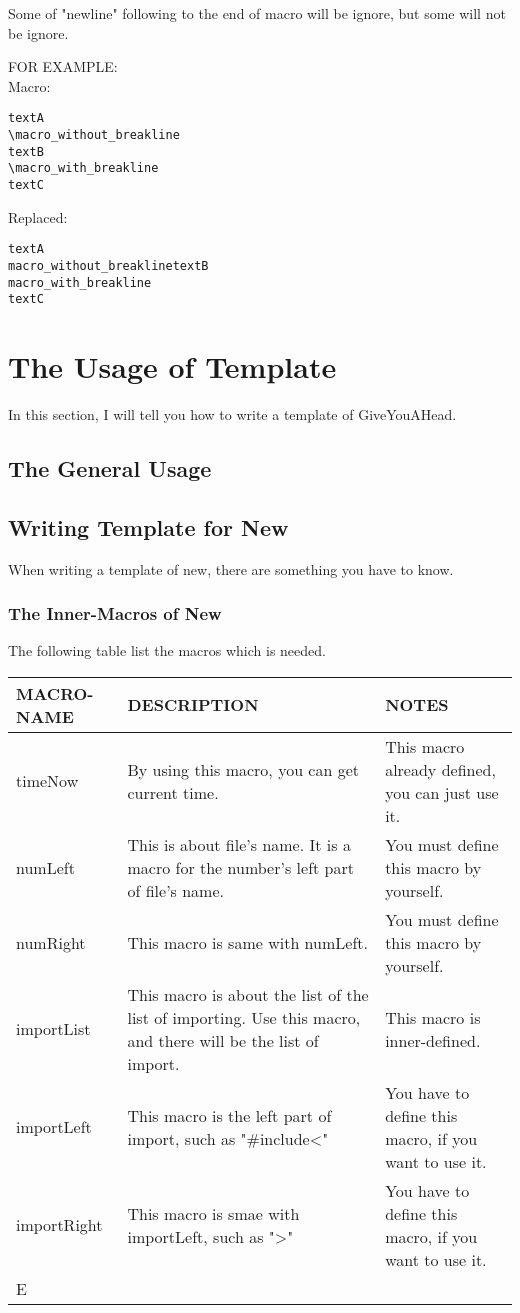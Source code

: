 \documentclass[UTF8]{article} %
\begin{document}
Some of "newline" following to the end of macro will be ignore, but some will not be ignore.

FOR EXAMPLE:\\
Macro:
\begin{lstlisting}
textA
\macro_without_breakline
textB
\macro_with_breakline
textC
\end{lstlisting}
Replaced:
\begin{lstlisting}
textA
macro_without_breaklinetextB
macro_with_breakline
textC
\end{lstlisting}
\newpage
 
\section{The Usage of Template}
In this section, I will tell you how to write a template of GiveYouAHead.
\subsection{The General Usage}
\subsection{Writing Template for New}
When writing a template of new, there are something you have to know.
\subsubsection{The Inner-Macros of New}
The following table list the macros which is needed.
\begin{center}
    \begin{tabular}{|p{}|p{}|p{}|}
    \hline \rule[-2ex]{0pt}{5.5ex} MACRO-NAME & DESCRIPTION & NOTES \\ 
    \hline \rule[-2ex]{0pt}{5.5ex} timeNow & By using this macro, you can get current time. & This macro already defined, you can just use it. \\ 
    \hline \rule[-2ex]{0pt}{5.5ex} numLeft & This is about file's name. It is a macro for the number's left part of file's name. & You must define this macro by yourself. \\ 
    \hline \rule[-2ex]{0pt}{5.5ex} numRight & This macro is same with numLeft. & You must define this macro by yourself. \\ 
    \hline \rule[-2ex]{0pt}{5.5ex} importList & This macro is about the list of the list of importing. Use this macro, and there will be the list of import.   & This macro is inner-defined. \\ 
    \hline \rule[-2ex]{0pt}{5.5ex} importLeft & This macro is the left part of import, such as "\#include<" & You have to define this macro, if you want to use it.  \\ 
    \hline \rule[-2ex]{0pt}{5.5ex} importRight & This macro is smae with importLeft, such as ">" & You have to define this macro, if you want to use it. \\ 
    \hline \rule[-2ex]{0pt}{5.5ex} E
\end{tabular} 

\end{center}
\end{document}
